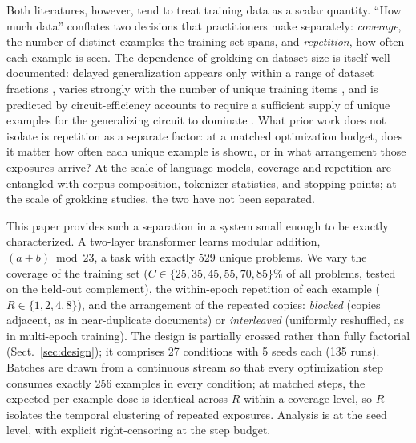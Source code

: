 \documentclass[10pt]{article}
\newcommand{\coverage}{C}
\newcommand{\repetition}{R}
\begin{document}
Both literatures, however, tend to treat training data as a scalar quantity. ``How much data'' conflates two decisions that practitioners make separately: \emph{coverage}, the number of distinct examples the training set spans, and \emph{repetition}, how often each example is seen. The dependence of grokking on dataset size is itself well documented: delayed generalization appears only within a range of dataset fractions \citep{power2022grokking}, varies strongly with the number of unique training items \citep{liu2023omnigrok}, and is predicted by circuit-efficiency accounts to require a sufficient supply of unique examples for the generalizing circuit to dominate \citep{varma2024explaining}. What prior work does not isolate is repetition as a separate factor: at a matched optimization budget, does it matter how often each unique example is shown, or in what arrangement those exposures arrive? At the scale of language models, coverage and repetition are entangled with corpus composition, tokenizer statistics, and stopping points; at the scale of grokking studies, the two have not been separated.

This paper provides such a separation in a system small enough to be exactly characterized. A two-layer transformer learns modular addition, $(a+b) \bmod 23$, a task with exactly 529 unique problems. We vary the coverage of the training set ($\coverage \in \{25,35,45,55,70,85\}\%$ of all problems, tested on the held-out complement), the within-epoch repetition of each example ($\repetition \in \{1,2,4,8\}$), and the arrangement of the repeated copies: \emph{blocked} (copies adjacent, as in near-duplicate documents) or \emph{interleaved} (uniformly reshuffled, as in multi-epoch training). The design is partially crossed rather than fully factorial (Sect.~\ref{sec:design}); it comprises 27 conditions with 5 seeds each (135 runs). Batches are drawn from a continuous stream so that every optimization step consumes exactly 256 examples in every condition; at matched steps, the expected per-example dose is identical across $\repetition$ within a coverage level, so $\repetition$ isolates the temporal clustering of repeated exposures. Analysis is at the seed level, with explicit right-censoring at the step budget.
\end{document}
